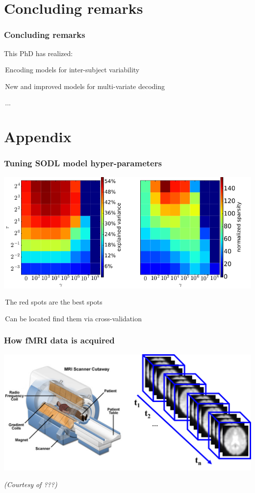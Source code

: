 \documentclass{beamer}
\def\mydot{\structure{\rule{1ex}{1ex}}\,}
\begin{document}
\section{Concluding remarks}
\begin{frame}\Large
  \frametitle{Concluding remarks}
  This PhD has realized:
  
  \mydot Encoding models for inter-subject variability

  \bigskip
  
  \mydot New and improved models for multi-variate decoding

  \bigskip

  \mydot ...
\end{frame}

\section{Appendix}
\begin{frame}
  \frametitle{{Tuning SODL model hyper-parameters}}%
  \includegraphics[width=1.\linewidth]{cv.png}
  \bigskip
  
  \mydot{The red spots are the best spots}

  \bigskip
  
  \mydot{Can be located find them via cross-validation}
\end{frame}

\begin{frame}\frametitle{How fMRI data is acquired}
    \centering
    \includegraphics[scale=.4]{fmri_setup}

\tiny{\textit{(Courtesy of ???)}}
\end{frame}
\end{document}
